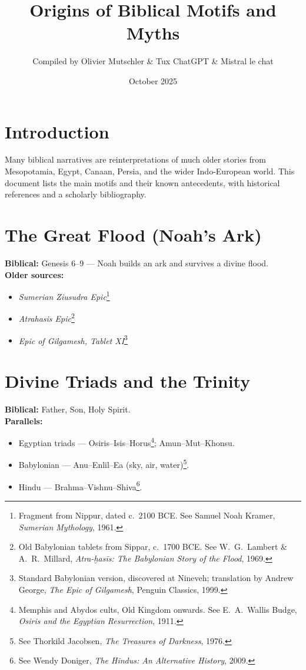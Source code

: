 \documentclass[11pt,a4paper]{article}
\title{\textbf{Origins of Biblical Motifs and Myths}}
\author{Compiled by Olivier Mutschler \& Tux ChatGPT \& Mistral le chat}
\date{October 2025}
\begin{document}
\maketitle

\section*{Introduction}
Many biblical narratives are reinterpretations of much older stories from Mesopotamia, Egypt, Canaan, Persia, and the wider Indo-European world.  
This document lists the main motifs and their known antecedents, with historical references and a scholarly bibliography.

\section{The Great Flood (Noah’s Ark)}
\textbf{Biblical:} Genesis 6–9 — Noah builds an ark and survives a divine flood.\\
\textbf{Older sources:}
\begin{itemize}
  \item \emph{Sumerian Ziusudra Epic}\footnote{Fragment from Nippur, dated c.\ 2100 BCE. See Samuel Noah Kramer, \emph{Sumerian Mythology}, 1961.}
  \item \emph{Atrahasis Epic}\footnote{Old Babylonian tablets from Sippar, c.\ 1700 BCE. See W.\ G.\ Lambert \& A.\ R.\ Millard, \emph{Atra-ḫasīs: The Babylonian Story of the Flood}, 1969.}
  \item \emph{Epic of Gilgamesh, Tablet XI}\footnote{Standard Babylonian version, discovered at Nineveh; translation by Andrew George, \emph{The Epic of Gilgamesh}, Penguin Classics, 1999.}
\end{itemize}

\section{Divine Triads and the Trinity}
\textbf{Biblical:} Father, Son, Holy Spirit.\\
\textbf{Parallels:}
\begin{itemize}
  \item Egyptian triads — Osiris–Isis–Horus\footnote{Memphis and Abydos cults, Old Kingdom onwards. See E.\ A.\ Wallis Budge, \emph{Osiris and the Egyptian Resurrection}, 1911.}; Amun–Mut–Khonsu.
  \item Babylonian — Anu–Enlil–Ea (sky, air, water)\footnote{See Thorkild Jacobsen, \emph{The Treasures of Darkness}, 1976.}.
  \item Hindu — Brahma–Vishnu–Shiva\footnote{See Wendy Doniger, \emph{The Hindus: An Alternative History}, 2009.}.
\end{itemize}
\end{document}
